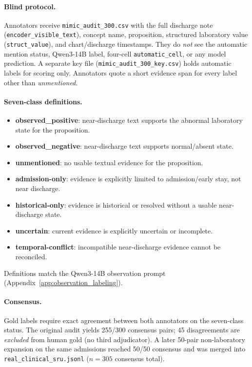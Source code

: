 \documentclass[11pt]{article}
\begin{document}
\paragraph{Blind protocol.}
Annotators receive \texttt{mimic\_audit\_300.csv} with the full discharge note
(\texttt{encoder\_visible\_text}), concept name, proposition, structured
laboratory value (\texttt{struct\_value}), and chart/discharge timestamps.
They do \emph{not} see the automatic mention status, Qwen3-14B label,
four-cell \texttt{automatic\_cell}, or any model prediction. A separate key
file (\texttt{mimic\_audit\_300\_key.csv}) holds automatic labels for scoring
only. Annotators quote a short evidence span for every label other than
\emph{unmentioned}.

\paragraph{Seven-class definitions.}
\begin{itemize}
  \item \textbf{observed\_positive}: near-discharge text supports the abnormal
  laboratory state for the proposition.
  \item \textbf{observed\_negative}: near-discharge text supports normal/absent
  state.
  \item \textbf{unmentioned}: no usable textual evidence for the proposition.
  \item \textbf{admission-only}: evidence is explicitly limited to
  admission/early stay, not near discharge.
  \item \textbf{historical-only}: evidence is historical or resolved without a
  usable near-discharge state.
  \item \textbf{uncertain}: current evidence is explicitly uncertain or
  incomplete.
  \item \textbf{temporal-conflict}: incompatible near-discharge evidence cannot
  be reconciled.
\end{itemize}
Definitions match the Qwen3-14B observation prompt
(Appendix~\ref{app:observation_labeling}).

\paragraph{Consensus.}
Gold labels require exact agreement between both annotators on the seven-class
status. The original audit yields 255/300 consensus pairs; 45 disagreements are
\emph{excluded} from human gold (no third adjudicator). A later 50-pair
non-laboratory expansion on the same admissions reached 50/50 consensus and
was merged into \texttt{real\_clinical\_sru.jsonl} ($n=305$ consensus total).
\end{document}

